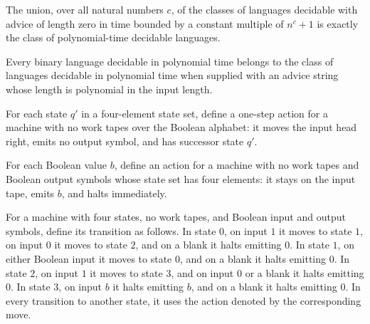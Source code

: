 \begin{theorem}
\label{Complexity.iUnion_DTIMEAdvice_zero_eq_P}
\leanok
{}
The union, over all natural numbers $c$, of the classes of languages decidable with
advice of length zero in time bounded by a constant multiple of $n^c+1$ is exactly the
class of polynomial-time decidable languages.
\end{theorem}

\begin{theorem}
\label{Complexity.P_subset_PAdvicePoly}
\leanok
{}
Every binary language decidable in polynomial time belongs to the class of languages
decidable in polynomial time when supplied with an advice string whose length is
polynomial in the input length.
\end{theorem}

\begin{definition}
\label{Complexity.aoMove}
\leanok
{}
For each state $q'$ in a four-element state set, define a one-step action for a machine
with no work tapes over the Boolean alphabet: it moves the input head right, emits no
output symbol, and has successor state $q'$.
\end{definition}

\begin{definition}
\label{Complexity.aoHalt}
\leanok
{}
For each Boolean value $b$, define an action for a machine with no work tapes and
Boolean output symbols whose state set has four elements: it stays on the input tape,
emits $b$, and halts immediately.
\end{definition}

\begin{definition}
\label{Complexity.aoTr}
\leanok
{}
For a machine with four states, no work tapes, and Boolean input and output symbols,
define its transition as follows. In state $0$, on input $1$ it moves to state $1$, on
input $0$ it moves to state $2$, and on a blank it halts emitting $0$. In state $1$, on
either Boolean input it moves to state $0$, and on a blank it halts emitting $0$. In
state $2$, on input $1$ it moves to state $3$, and on input $0$ or a blank it halts
emitting $0$. In state $3$, on input $b$ it halts emitting $b$, and on a blank it halts
emitting $0$. In every transition to another state, it uses the action denoted by the
corresponding move.
\end{definition}

